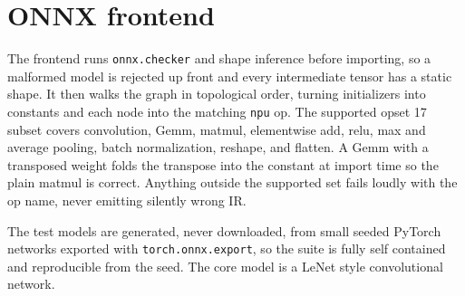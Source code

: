 \section{ONNX frontend}

The frontend runs \texttt{onnx.checker} and shape inference before importing, so a
malformed model is rejected up front and every intermediate tensor has a static
shape. It then walks the graph in topological order, turning initializers into
constants and each node into the matching \texttt{npu} op. The supported opset 17
subset covers convolution, Gemm, matmul, elementwise add, relu, max and average
pooling, batch normalization, reshape, and flatten. A Gemm with a transposed
weight folds the transpose into the constant at import time so the plain matmul is
correct. Anything outside the supported set fails loudly with the op name, never
emitting silently wrong IR.

The test models are generated, never downloaded, from small seeded PyTorch
networks exported with \texttt{torch.onnx.export}, so the suite is fully self
contained and reproducible from the seed. The core model is a LeNet style
convolutional network.
